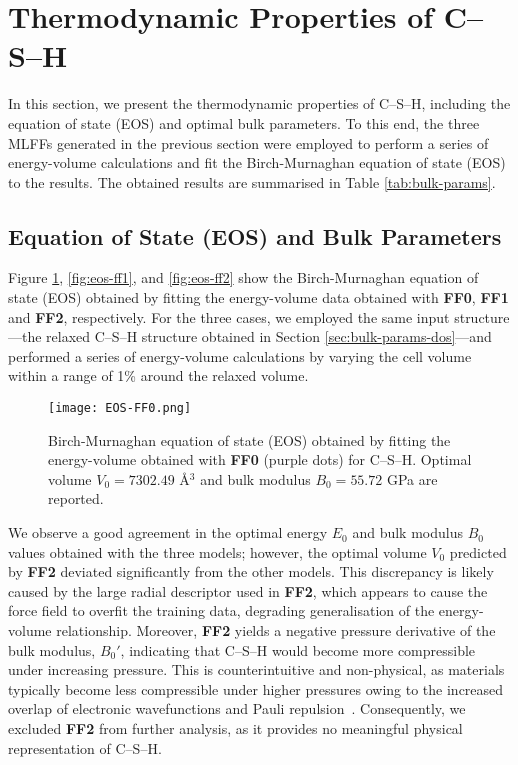 \section{Thermodynamic Properties of C--S--H}
\label{sec:thermo-properties}
In this section, we present the thermodynamic properties of C--S--H, including the equation of state (EOS) and optimal bulk parameters. To this end, the three MLFFs generated in the previous section were employed to perform a series of energy-volume calculations and fit the Birch-Murnaghan equation of state (EOS) to the results. The obtained results are summarised in Table \ref{tab:bulk-params}.

\subsection{Equation of State (EOS) and Bulk Parameters}
Figure \ref{fig:eos-ff0}, \ref{fig:eos-ff1}, and \ref{fig:eos-ff2} show the Birch-Murnaghan equation of state (EOS) obtained by fitting the energy-volume data obtained with \textbf{FF0}, \textbf{FF1} and \textbf{FF2}, respectively.  For the three cases, we employed the same input structure---the relaxed C--S--H structure obtained in Section \ref{sec:bulk-params-dos}---and performed a series of energy-volume calculations by varying the cell volume within a range of 1\% around the relaxed volume. 


\begin{figure}[h!]
    \centering
    \texttt{[image: EOS-FF0.png]}
    \caption{Birch-Murnaghan equation of state (EOS) obtained by fitting the energy-volume obtained with \textbf{FF0} (purple dots) for C--S--H. Optimal volume $V_0=7302.49$ \AA$^3$ and bulk modulus $B_0=55.72$ GPa are reported.
    }
    \label{fig:eos-ff0}
\end{figure}

We observe a good agreement in the optimal energy $E_0$ and bulk modulus $B_0$ values obtained with the three models; however, the optimal volume $V_0$ predicted by \textbf{FF2} deviated significantly from the other models. This discrepancy is likely caused by the large radial descriptor used in \textbf{FF2}, which appears to cause the force field to overfit the training data, degrading generalisation of the energy-volume relationship. Moreover, \textbf{FF2} yields a negative pressure derivative of the bulk modulus, $B_0'$, indicating that C--S--H would become more compressible under increasing pressure. This is counterintuitive and non-physical, as materials typically become less compressible under higher pressures owing to the increased overlap of electronic wavefunctions and Pauli repulsion~\cite{gilman2003electronic}. Consequently, we excluded \textbf{FF2} from further analysis, as it provides no meaningful physical representation of C--S--H.

